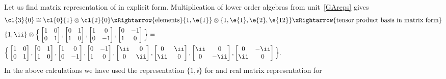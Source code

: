 %
\begin{example}\label{excl30}
Let us find matrix representation of  in explicit form.
Multiplication of lower order algebras from unit~\ref{GAreps}
gives
\[\begin{split}
&\cl{3}{0}\cong\cl{0}{1}\otimes\cl{2}{0}
\xRightarrow{\textrm{elements}} \{1,\e{1}\}\otimes\{1,\e{1},\e{2},\e{12}\}
 \xRightarrow{\textrm{tensor product basis in matrix form}}\\
&\{1,\ii\}\otimes \Big\{
\begin{bmatrix}1&0\\0&1\end{bmatrix},
\begin{bmatrix}0&1\\1&0\end{bmatrix},
\begin{bmatrix}1&0\\0&-1\end{bmatrix},
\begin{bmatrix}0&-1\\1&0\end{bmatrix}\Big\}= \\
&\Big\{ \begin{bmatrix}1&0\\0&1\end{bmatrix},
\begin{bmatrix}0&1\\1&0\end{bmatrix},
\begin{bmatrix}1&0\\0&-1\end{bmatrix},
\begin{bmatrix}0&-1\\1&0\end{bmatrix},
\begin{bmatrix}\ii&0\\0&\ii\end{bmatrix},
\begin{bmatrix}0&\ii\\\ii&0\end{bmatrix},
\begin{bmatrix}\ii&0\\0&-\ii\end{bmatrix},
\begin{bmatrix}0&-\ii\\\ii&0\end{bmatrix}
\Big\}.
\end{split}\]
In the above calculations we have used the representation
$\{1,\ii\}$ for  and  real matrix representation for

\end{example}

